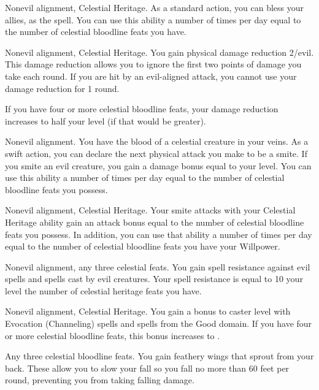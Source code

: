 \featpres
Nonevil alignment, Celestial Heritage.
\featben As a standard action, you can bless your allies, as the 
spell.
You can use this ability a number of times per day equal to the number of celestial bloodline feats you have.

\featpres
Nonevil alignment, Celestial Heritage.
\featben You gain physical damage reduction 2/evil.
This damage reduction allows you to ignore the first two points of damage you take each round.
If you are hit by an evil-aligned attack, you cannot use your damage reduction for 1 round.

If you have four or more celestial bloodline feats, your damage reduction increases to half your level (if that would be greater).

\featpre Nonevil alignment.
\featben You have the blood of a celestial creature in your veins.
As a swift action, you can declare the next physical attack you make to be a smite.
If you smite an evil creature, you gain a damage bonus equal to your level.
You can use this ability a number of times per day equal to the number of celestial bloodline feats you possess.

\featpres
Nonevil alignment, Celestial Heritage.
\featben Your smite attacks with your Celestial Heritage ability gain an attack bonus equal to the number of celestial bloodline feats you possess.
In addition, you can use that ability a number of times per day equal to the number of celestial bloodline feats you have \add your Willpower.

\featpres
Nonevil alignment, any three celestial feats.
\featben You gain spell resistance against evil spells and spells cast by evil creatures.
Your spell resistance is equal to 10 \add your level \add the number of celestial heritage feats you have.

\featpres
Nonevil alignment, Celestial Heritage.
\featben You gain a  bonus to caster level with Evocation (Channeling) spells and spells from the Good domain.
If you have four or more celestial bloodline feats, this bonus increases to .

\featpre Any three celestial bloodline feats.
\featben You gain feathery wings that sprout from your back.
These allow you to slow your fall so you fall no more than 60 feet per round, preventing you from taking falling damage.

